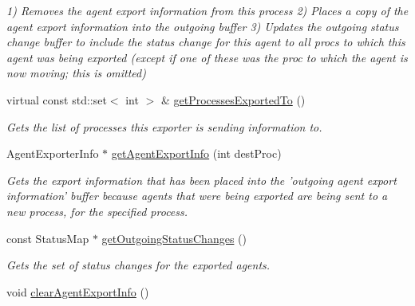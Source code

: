 \begin{DoxyCompactItemize}
\begin{DoxyCompactList}\small\item\em 1) Removes the agent export information from this process 2) Places a copy of the agent export information into the outgoing buffer 3) Updates the outgoing status change buffer to include the status change for this agent to all procs to which this agent was being exported (except if one of these was the proc to which the agent is now moving; this is omitted) \end{DoxyCompactList}\item 
\hypertarget{classrepast_1_1_abstract_exporter_a4f43a562a4f86fb1e4f4dde47508347a}{virtual const std\-::set$<$ int $>$ \& \hyperlink{classrepast_1_1_abstract_exporter_a4f43a562a4f86fb1e4f4dde47508347a}{get\-Processes\-Exported\-To} ()}\label{classrepast_1_1_abstract_exporter_a4f43a562a4f86fb1e4f4dde47508347a}

\begin{DoxyCompactList}\small\item\em Gets the list of processes this exporter is sending information to. \end{DoxyCompactList}\item 
\hypertarget{classrepast_1_1_abstract_exporter_af63857911d4eb8a59a207daf659c047c}{Agent\-Exporter\-Info $\ast$ \hyperlink{classrepast_1_1_abstract_exporter_af63857911d4eb8a59a207daf659c047c}{get\-Agent\-Export\-Info} (int dest\-Proc)}\label{classrepast_1_1_abstract_exporter_af63857911d4eb8a59a207daf659c047c}

\begin{DoxyCompactList}\small\item\em Gets the export information that has been placed into the 'outgoing agent export information' buffer because agents that were being exported are being sent to a new process, for the specified process. \end{DoxyCompactList}\item 
\hypertarget{classrepast_1_1_abstract_exporter_a6e5c166941bf27d1dfbc6ce9162c327f}{const Status\-Map $\ast$ \hyperlink{classrepast_1_1_abstract_exporter_a6e5c166941bf27d1dfbc6ce9162c327f}{get\-Outgoing\-Status\-Changes} ()}\label{classrepast_1_1_abstract_exporter_a6e5c166941bf27d1dfbc6ce9162c327f}

\begin{DoxyCompactList}\small\item\em Gets the set of status changes for the exported agents. \end{DoxyCompactList}\item 
\hypertarget{classrepast_1_1_abstract_exporter_aaed51e6be3878577e7e226a810d1d8c2}{void \hyperlink{classrepast_1_1_abstract_exporter_aaed51e6be3878577e7e226a810d1d8c2}{clear\-Agent\-Export\-Info} ()}\label{classrepast_1_1_abstract_exporter_aaed51e6be3878577e7e226a810d1d8c2}


\end{DoxyCompactItemize}
